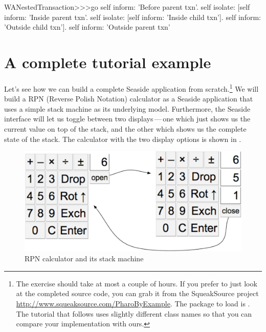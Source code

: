\documentclass[a4paper,10pt,twoside]{book}
\begin{document}
\begin{code}{}
WANestedTransaction>>>go
	self inform: 'Before parent txn'.
	self isolate:
			[self inform: 'Inside parent txn'.
			self isolate: [self inform: 'Inside child txn'].
			self inform: 'Outside child txn'].
	self inform: 'Outside parent txn'
\end{code}


\section{A complete tutorial example}


Let's see how we can build a complete Seaside application from scratch.\footnote{The exercise should take at most a couple of hours. If you prefer to just look at the completed source code, you can grab it from the SqueakSource project \url{http://www.squeaksource.com/PharoByExample}.
The package to load is . The tutorial that follows uses slightly different class names so that you can compare your implementation with ours.}
We will build a RPN (Reverse Polish Notation) calculator as a Seaside application that uses a simple stack machine as its underlying model.
Furthermore, the Seaside interface will let us toggle between two displays\,---\,one which just shows us the current value on top of the stack, and the other which shows us the complete state of the stack.
The calculator with the two display options is shown in .

\begin{figure}[ht]
\begin{center}
\includegraphics[width=\textwidth]{stackMachine}
\caption{RPN calculator and its stack machine}
\end{center}
\end{figure}
\end{document}
